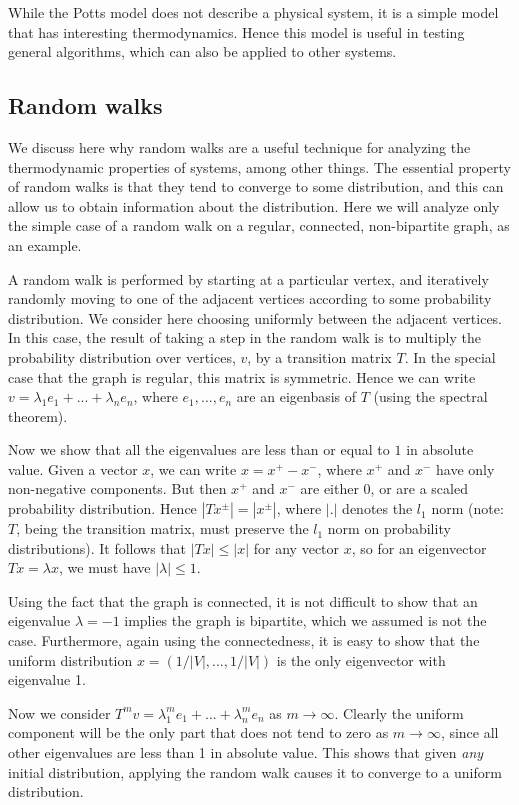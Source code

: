 \documentclass{article}
\begin{document}
While the Potts model does not describe a physical system, it is a simple model that has interesting thermodynamics.
Hence this model is useful in testing general algorithms, which can also be applied to other systems.

\subsection{Random walks}
We discuss here why random walks are a useful technique for analyzing the thermodynamic properties of systems, among other things.
The essential property of random walks is that they tend to converge to some distribution, and this can allow us to obtain information about the distribution.
Here we will analyze only the simple case of a random walk on a regular, connected, non-bipartite graph, as an example.

A random walk is performed by starting at a particular vertex, and iteratively randomly moving to one of the adjacent vertices according to some probability distribution.
We consider here choosing uniformly between the adjacent vertices.
In this case, the result of taking a step in the random walk is to multiply the probability distribution over vertices, $v$, by a transition matrix $T$.
In the special case that the graph is regular, this matrix is symmetric.
Hence we can write $v = \lambda_1e_1 + ... + \lambda_ne_n$, where $e_1, ..., e_n$ are an eigenbasis of $T$ (using the spectral theorem).

Now we show that all the eigenvalues are less than or equal to $1$ in absolute value.
Given a vector $x$, we can write $x = x^+ - x^-$, where $x^+$ and $x^-$ have only non-negative components.
But then $x^+$ and $x^-$ are either 0, or are a scaled probability distribution.
Hence $|Tx^\pm| = |x^\pm|$, where $|.|$ denotes the $l_1$ norm (note: $T$, being the transition matrix, must preserve the $l_1$ norm on probability distributions).
It follows that $|Tx| \leq |x|$ for any vector $x$, so for an eigenvector $Tx = \lambda x$, we must have $|\lambda| \leq 1$.

Using the fact that the graph is connected, it is not difficult to show that an eigenvalue $\lambda = -1$ implies the graph is bipartite, which we assumed is not the case.
Furthermore, again using the connectedness, it is easy to show that the uniform distribution $x = (1/|V|, ..., 1/|V|)$ is the only eigenvector with eigenvalue 1.

Now we consider $T^mv = \lambda_1^me_1 + ... + \lambda_n^me_n$ as $m\rightarrow\infty$.
Clearly the uniform component will be the only part that does not tend to zero as $m\rightarrow\infty$, since all other eigenvalues are less than 1 in absolute value.
This shows that given \emph{any} initial distribution, applying the random walk causes it to converge to a uniform distribution.
\end{document}
